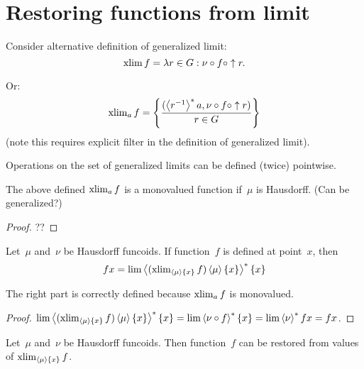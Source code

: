 \section{Restoring functions from limit}

Consider alternative definition of generalized limit:
\[ \operatorname{xlim} f = \lambda r\in G: \nu\circ f\circ\uparrow r. \]

Or:
\[ \operatorname{xlim}_a f = \left\{ \frac{(\left\langle r^{-1}\right\rangle ^{\ast}a, \nu\circ f\circ\uparrow r)}{r\in G}\right\} \]
(note this requires explicit filter in the definition of generalized limit).

Operations on the set of generalized limits can be defined (twice) pointwise. 

\begin{prop}
The above defined $\operatorname{xlim}_a f$ is a monovalued function if~$\mu$
is Hausdorff. (Can be generalized?)
\end{prop}

\begin{proof}
??
\end{proof}

\begin{lem}
Let~$\mu$ and~$\nu$ be Hausdorff funcoids. If function~$f$ is defined at point~$x$, then
\[ fx=
\lim\left\langle (\operatorname{xlim}_{\left\langle \mu\right\rangle\{x\}}f)\left\langle \mu\right\rangle\{x\}\right\rangle ^{\ast}\{x\}
\]
\end{lem}

\begin{rem}
The right part is correctly defined because
$\operatorname{xlim}_a f$ is monovalued.
\end{rem}

\begin{proof}
$\lim\left\langle (\operatorname{xlim}_{\left\langle \mu\right\rangle\{x\}}f)\left\langle \mu\right\rangle\{x\}\right\rangle ^{\ast}\{x\}=
\lim\left\langle \nu\circ f\right\rangle ^{\ast}\{x\}=\lim\left\langle \nu\right\rangle ^{\ast}fx=fx$.
\end{proof}

\begin{thm}
Let~$\mu$ and~$\nu$ be Hausdorff funcoids.
Then function~$f$ can be restored from values of $\operatorname{xlim}_{\left\langle \mu\right\rangle\{x\}}f$.
\end{thm}